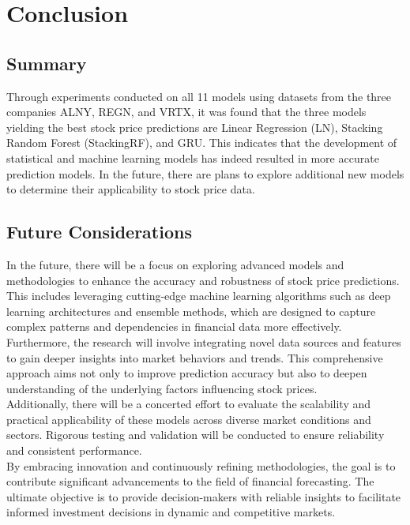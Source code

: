 \documentclass{ieeeojies}
\begin{document}
\section{Conclusion}
\subsection{Summary}
Through experiments conducted on all 11 models using datasets from the three companies ALNY, REGN, and VRTX, it was found that the three models yielding the best stock price predictions are Linear Regression (LN), Stacking Random Forest (StackingRF), and GRU. This indicates that the development of statistical and machine learning models has indeed resulted in more accurate prediction models. In the future, there are plans to explore additional new models to determine their applicability to stock price data.
\subsection{Future Considerations}
In the future, there will be a focus on exploring advanced models and methodologies to enhance the accuracy and robustness of stock price predictions. This includes leveraging cutting-edge machine learning algorithms such as deep learning architectures and ensemble methods, which are designed to capture complex patterns and dependencies in financial data more effectively.\\
Furthermore, the research will involve integrating novel data sources and features to gain deeper insights into market behaviors and trends. This comprehensive approach aims not only to improve prediction accuracy but also to deepen understanding of the underlying factors influencing stock prices.\\
Additionally, there will be a concerted effort to evaluate the scalability and practical applicability of these models across diverse market conditions and sectors. Rigorous testing and validation will be conducted to ensure reliability and consistent performance.\\
By embracing innovation and continuously refining methodologies, the goal is to contribute significant advancements to the field of financial forecasting. The ultimate objective is to provide decision-makers with reliable insights to facilitate informed investment decisions in dynamic and competitive markets.\\
\end{document}
